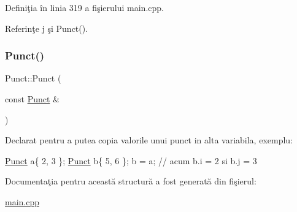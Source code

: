 Definiţia în linia 319 a fişierului main.\+cpp.



Referinţe j şi Punct().

\mbox{\label{structPunct_afa529a8fdfbc33103f357f754ba4105e}} 
\subsubsection{\texorpdfstring{Punct()}{Punct()}\hspace{0.1cm}{\footnotesize\ttfamily [3/3]}}
{\footnotesize\ttfamily Punct\+::\+Punct (\begin{DoxyParamCaption}\item[{const \hyperlink{structPunct}{Punct} \&}]{ }\end{DoxyParamCaption})\hspace{0.3cm}{\ttfamily [default]}}

Declarat pentru a putea copia valorile unui punct in alta variabila, exemplu\+: 
\begin{DoxyCode}
\hyperlink{structPunct}{Punct} a\{ 2, 3 \};
\hyperlink{structPunct}{Punct} b\{ 5, 6 \};
b = a; \textcolor{comment}{// acum b.i = 2 si b.j = 3}
\end{DoxyCode}
 

Documentaţia pentru această structură a fost generată din fişierul\+:\begin{DoxyCompactItemize}
\item 
\hyperlink{main_8cpp}{main.\+cpp}\end{DoxyCompactItemize}
